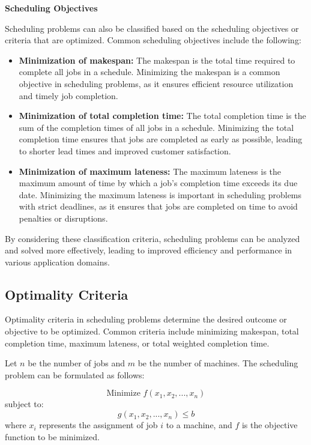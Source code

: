 \documentclass[12pt]{book} %
\begin{document}
\textbf{Scheduling Objectives}

Scheduling problems can also be classified based on the scheduling objectives or criteria that are optimized. Common scheduling objectives include the following:

\begin{itemize}
    \item \textbf{Minimization of makespan:} The makespan is the total time required to complete all jobs in a schedule. Minimizing the makespan is a common objective in scheduling problems, as it ensures efficient resource utilization and timely job completion.
    
    \item \textbf{Minimization of total completion time:} The total completion time is the sum of the completion times of all jobs in a schedule. Minimizing the total completion time ensures that jobs are completed as early as possible, leading to shorter lead times and improved customer satisfaction.
    
    \item \textbf{Minimization of maximum lateness:} The maximum lateness is the maximum amount of time by which a job's completion time exceeds its due date. Minimizing the maximum lateness is important in scheduling problems with strict deadlines, as it ensures that jobs are completed on time to avoid penalties or disruptions.
\end{itemize}

By considering these classification criteria, scheduling problems can be analyzed and solved more effectively, leading to improved efficiency and performance in various application domains.

\subsection{Optimality Criteria}

Optimality criteria in scheduling problems determine the desired outcome or objective to be optimized. Common criteria include minimizing makespan, total completion time, maximum lateness, or total weighted completion time. 

Let $n$ be the number of jobs and $m$ be the number of machines. The scheduling problem can be formulated as follows:

\[
\text{Minimize } f(x_1, x_2, ..., x_n)
\]
subject to:
\[
g(x_1, x_2, ..., x_n) \leq b
\]
where $x_i$ represents the assignment of job $i$ to a machine, and $f$ is the objective function to be minimized.
\end{document}
